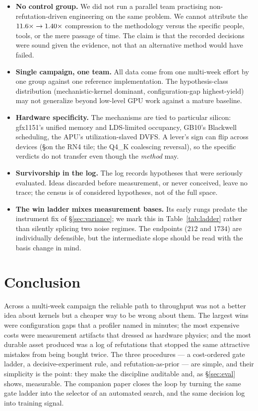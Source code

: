 \documentclass[11pt]{article}
\begin{document}
\begin{itemize}[leftmargin=1.4em,itemsep=2pt,topsep=2pt]
\item \textbf{No control group.} We did not run a parallel team practising non-refutation-driven
engineering on the same problem. We cannot attribute the $11.6\times\to1.40\times$ compression to the methodology
versus the specific people, tools, or the mere passage of time. The claim is that the recorded decisions
were sound given the evidence, not that an alternative method would have failed.
\item \textbf{Single campaign, one team.} All data come from one multi-week effort by one group against one
reference implementation. The hypothesis-class distribution (mechanistic-kernel dominant, configuration-gap
highest-yield) may not generalize beyond low-level GPU work against a mature baseline.
\item \textbf{Hardware specificity.} The mechanisms are tied to particular silicon: gfx1151's unified
memory and LDS-limited occupancy, GB10's Blackwell scheduling, the APU's utilization-slaved DVFS. A
lever's sign can flip across devices (\S on the RN4 tile; the Q4\_K coalescing reversal), so the specific
verdicts do not transfer even though the \emph{method} may.
\item \textbf{Survivorship in the log.} The log records hypotheses that were seriously evaluated. Ideas
discarded before measurement, or never conceived, leave no trace; the census is of considered hypotheses,
not of the full space.
\item \textbf{The win ladder mixes measurement bases.} Its early rungs predate the instrument fix of
\S\ref{sec:variance}; we mark this in Table~\ref{tab:ladder} rather than silently splicing two noise
regimes. The endpoints ($212$ and $1734$) are individually defensible, but the intermediate slope should be
read with the basis change in mind.
\end{itemize}

\section{Conclusion}
\label{sec:conclusion}

Across a multi-week campaign the reliable path to throughput was not a better idea about kernels but a
cheaper way to be wrong about them. The largest wins were configuration gaps that a profiler named in
minutes; the most expensive costs were measurement artifacts that dressed as hardware physics; and the most
durable asset produced was a log of refutations that stopped the same attractive mistakes from being bought
twice. The three procedures --- a cost-ordered gate ladder, a decisive-experiment rule, and
refutation-as-prior --- are simple, and their simplicity is the point: they make the discipline auditable
and, as \S\ref{sec:eval} shows, measurable. The companion paper closes the loop by turning the same gate
ladder into the selector of an automated search, and the same decision log into training signal.
\end{document}
